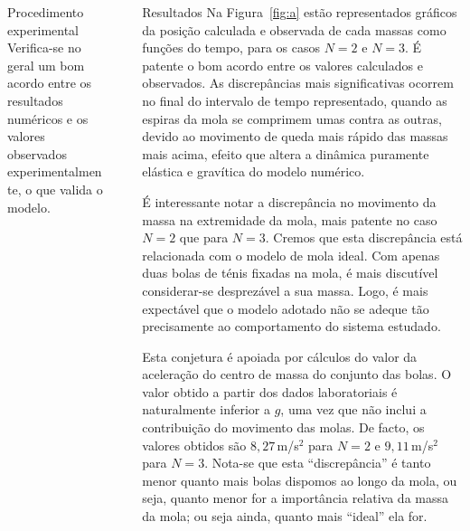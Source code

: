 \documentclass[final]{beamer}
\newlength{\sepwidth}
\newlength{\colwidth}
\newcommand{\separatorcolumn}{\begin{column}{\sepwidth}\end{column}}
\begin{document}
\begin{frame}[t]
\begin{columns}[t]
\begin{column}{\colwidth}
\begin{block}{Procedimento experimental}
Verifica-se no geral um bom acordo entre os resultados numéricos e os valores
observados experimentalmente, o que valida o modelo.
\end{block}
\end{column}

\separatorcolumn
\begin{column}{\colwidth}
\begin{block}{Resultados}
Na Figura~\ref{fig:a}  estão representados gráficos da posição calculada e
observada de cada massas como funções do tempo, para os casos $N=2$ e $N=3$. É
patente o bom acordo entre os valores calculados e observados. As discrepâncias
mais significativas ocorrem no final do intervalo de tempo representado, quando
as espiras da mola se comprimem umas contra as outras, devido ao movimento de
queda mais rápido das massas mais acima, efeito que altera a dinâmica puramente
elástica e gravítica do modelo numérico.

É interessante notar a discrepância no movimento da massa na extremidade
da mola, mais patente no caso $N=2$ que para $N=3$. Cremos que esta discrepância
está relacionada com o modelo de mola ideal. Com apenas duas bolas de ténis
fixadas na mola, é mais discutível considerar-se desprezável a sua massa. Logo,
é mais expectável que o modelo adotado não se adeque tão precisamente ao
comportamento do sistema estudado.

Esta conjetura é apoiada por cálculos do valor da aceleração do centro de massa
do conjunto das bolas. O valor obtido a partir dos dados laboratoriais é
naturalmente inferior a $g$, uma vez que não inclui a contribuição do movimento
das molas. De facto, os valores obtidos são $8,27$\,m/s$^2$ para $N=2$ e
$9,11$\,m/s$^2$ para $N=3$.  Nota-se que esta ``discrepância'' é tanto menor
quanto mais bolas dispomos ao longo da mola, ou seja, quanto menor for a
importância relativa da massa da mola; ou seja ainda, quanto mais ``ideal'' ela
for.
	

\end{block}
\end{column}
\end{columns}
\end{frame}
\end{document}
